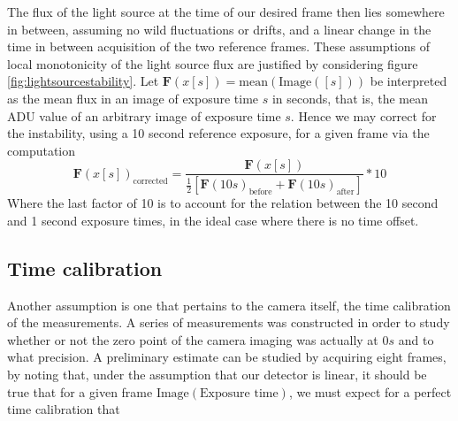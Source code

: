 \documentclass[../main.tex]{subfiles}
\begin{document}
		The flux of the light source at the time of our desired frame then lies somewhere in between, assuming no wild fluctuations or drifts, and a linear change in the time in between acquisition of the two reference frames. These assumptions of local monotonicity of the light source flux are justified by considering figure \ref{fig:lightsourcestability}. Let $\bm F(x[s]) = \text{mean}\left(\text{Image}([s])\right)$ be interpreted as the mean flux in an image of exposure time $s$ in seconds, that is, the mean ADU value of an arbitrary image of exposure time $s$. Hence we may correct for the instability, using a 10 second reference exposure, for a given frame via the computation
		\begin{equation}\label{eq:fluxcorrect_notimecal}
			\bm F(x [s])_\text{corrected} = \frac{\bm F(x [s])}{\frac12\left[\bm F(10s)_\text{before}+\bm F(10s)_\text{after}\right]} * 10
		\end{equation}
		Where the last factor of 10 is to account for the relation between the 10 second and 1 second exposure times, in the ideal case where there is no time offset.
		
		\subsection{Time calibration}
		Another assumption is one that pertains to the camera itself, the time calibration of the measurements. A series of measurements was constructed in order to study whether or not the zero point of the camera imaging was actually at $0s$ and to what precision. A preliminary estimate can be studied by acquiring eight frames, by noting that, under the assumption that our detector is linear, it should be true that for a given frame $\text{Image}(\text{Exposure time})$, we must expect for a perfect time calibration that 
		
\end{document}
